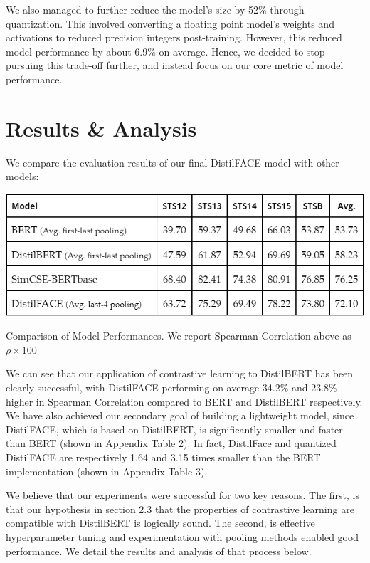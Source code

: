 \documentclass[10pt,twocolumn,letterpaper]{article}
\begin{document}
We also managed to further reduce the model's size by 52\% through quantization. This involved converting a floating point model’s weights and activations to reduced precision integers post-training.  However, this reduced model performance by about 6.9\% on average. Hence, we decided to stop pursuing this trade-off further, and instead focus on our core metric of model performance.


\section{Results \& Analysis}

We compare the evaluation results of our final DistilFACE model with other models:

\begin{table}[hbt!]
\centering
\includegraphics[scale=0.4]{images/Results-Compare-Models.png}
\caption{Comparison of Model Performances. We report Spearman Correlation above as \(\rho \times 100\)}
\label{fig:short}
\end{table}

 We can see that our application of contrastive learning to DistilBERT has been clearly successful, with DistilFACE performing on average 34.2\% and 23.8\% higher in Spearman Correlation compared to BERT and DistilBERT respectively. We have also achieved our secondary goal of building a lightweight model, since DistilFACE, which is based on DistilBERT, is significantly smaller and faster than BERT \cite{1910.01108} (shown in Appendix Table 2).  In fact, DistilFace and quantized DistilFACE are respectively 1.64 and 3.15 times smaller than the BERT implementation (shown in Appendix Table 3). 


We believe that our experiments were successful for two key reasons. The first, is that our hypothesis in section 2.3 that the properties of contrastive learning are compatible with DistilBERT is logically sound. The second, is effective hyperparameter tuning and experimentation with pooling methods enabled good performance. We detail the results and analysis of that process below.
\end{document}
